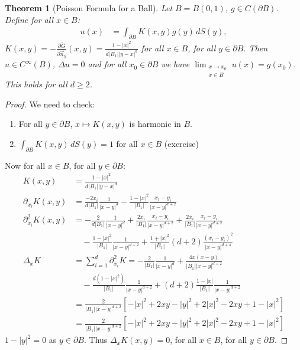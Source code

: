 \documentclass{report}
\theoremstyle{tommy}
\newtheorem{thm}[defn]{Theorem}
\begin{document}
  \begin{thm}[Poisson Formula for a Ball] Let \(B = B(0,1)\), \(g \in C(\partial B)\). Define for all \(x \in B\):
    \begin{align*}
      u(x) &= \int_{\partial B} K(x,y) g(y) \, dS(y),
    \end{align*}
    \(K(x,y) = - \frac{\partial \tilde G}{\partial \vec{n}_y}(x,y) = \frac{1-|x|^2}{d|B_1||y-x|^d}\) for all \(x \in B\), for all \(y \in \partial B\). Then \(u \in C^\infty(B)\), \(\Delta u = 0\) and for all \(x_0 \in \partial B\) we have \(\lim_{\substack{x \to x_0 \\ x \in B}} u(x) = g(x_0)\). This holds for all \(d \ge 2\).
  \end{thm}


  \begin{proof}
    We need to check: \begin{enumerate}
      \item For all \(y \in \partial B\), \(x \mapsto K(x,y)\) is harmonic in \(B\).
      \item \(\int_{\partial B} K(x,y) \, dS(y) = 1\) for all \(x \in B\) (exercise)
    \end{enumerate}
    Now for all \(x \in B\), for all \(y \in \partial B\):
    \begin{align*}
      K(x,y) &= \frac{1-|x|^2}{d|B_1||y-x|^d} \\
      \partial_{x_i} K(x,y) &= \frac{-2x_i}{d|B_1|} \frac{1}{|x-y|^d} - \frac{1-|x|^2}{|B_1|} \frac{x_i - y_i}{|x-y|^{d+2}} \\
      \partial_{x_i}^2 K(x,y) &= - \frac{2}{d|B_1|} \frac{1}{|x-y|^d} + \frac{2 x_i}{|B_1|} \frac{x_i - y_i}{|x-y|^{d+2}} + \frac{2 x_i}{|B_1|} \frac{x_i - y_i}{|x-y|^{d+2}} \\
      &\quad - \frac{1-|x|^2}{|B_1|} \frac{1}{|x-y|^{d+2}} + \frac{1+|x|^2}{|B_1|} (d+2) \frac{(x_i-y_i)^2}{|x-y|^{d+4}}\\
      \Delta_x K &= \sum_{i=1}^d \partial_{x_i}^2 K = - \frac{2}{|B_1|} \frac{1}{|x-y|^d} + \frac{4 x(x-y)}{|B_1||x-y|^{d+2}} \\
      &\quad - \frac{d(1-|x|^2)}{|B_1|} \frac{1}{|x-y|^{d+2}} + (d+2) \frac{1-|x|}{|B_1|} \frac{1}{|x-y|^{d+2}} \\
      &= \frac{2}{|B_1||x-y|^{d+2}} [-|x|^2 + 2xy - |y|^2 + 2|x|^2 - 2xy + 1 - |x|^2] \\
      &= \frac{2}{|B_1||x-y|^{d+2}} [-|x|^2 + 2xy - |y|^2 + 2|x|^2 - 2xy + 1 - |x|^2]
    \end{align*}
    \(1 - |y|^2 = 0\) as \(y \in \partial B\). Thus \(\Delta_x K(x,y) = 0\), for all \(x \in B\), for all \(y \in \partial B\).

\end{proof}
\end{document}
